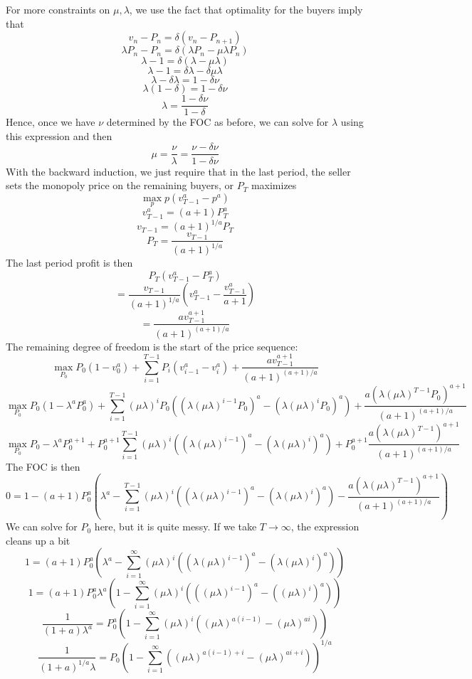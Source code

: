 \documentclass[10pt,letter]{article}
\begin{document}
For more constraints on $\mu, \lambda$, we use the fact that optimality for the buyers imply that
\[ v_{n} - P_n = \delta(v_{n} - P_{n+1}) \]
\[ \lambda P_n - P_n = \delta(\lambda P_{n} - \mu\lambda P_{n}) \]
\[ \lambda - 1 = \delta(\lambda  - \mu\lambda ) \]
\[ \lambda - 1 = \delta\lambda  - \delta \mu\lambda  \]
\[ \lambda - \delta\lambda =  1 - \delta \nu  \]
\[ \lambda (1 - \delta) =  1 - \delta \nu  \]
\[ \lambda  =  \frac{1 - \delta \nu}{1 - \delta}  \]
Hence, once we have $\nu$ determined by the FOC as before, we can solve for $\lambda$ using this expression and then
\[ \mu = \frac{\nu}{\lambda} = \frac{\nu - \delta\nu}{1 - \delta \nu}  \]
With the backward induction, we just require that in the last period, the seller sets the monopoly price on the remaining buyers, or $P_T$ maximizes
\[\max_p p (v_{T-1}^a - p^a)  \]
\[ v_{T-1}^a = (a + 1)P_T^a \]
\[ v_{T-1} = (a + 1)^{1/a}P_T \]
\[ P_T = \frac{v_{T-1}}{(a + 1)^{1/a}} \]
The last period profit is then
\[ P_T (v_{T-1}^a - P_T^a ) \]
\[ =\frac{v_{T-1}}{(a + 1)^{1/a}} (v_{T-1}^a - \frac{v_{T-1}^a}{a + 1} ) \]
\[ =\frac{a v_{T-1}^{a+1}}{(a + 1)^{(a + 1)/a}}  \]
The remaining degree of freedom is the start of the price sequence:
\[ \max_{P_0} P_0(1 - v_0^a )+\sum_{i=1}^{T-1}P_i(v_{i-1}^a - v_{i}^a) + \frac{a v_{T-1}^{a+1}}{(a + 1)^{(a + 1)/a}} \]
\[ \max_{P_0} P_0(1 - \lambda^a P_0^a )+\sum_{i=1}^{T-1}(\mu\lambda)^i P_0((\lambda (\mu\lambda)^{i-1} P_0)^a - (\lambda (\mu\lambda)^i P_0)^a) + \frac{a (\lambda (\mu\lambda)^{T-1} P_0)^{a+1}}{(a + 1)^{(a + 1)/a}} \]
\[ \max_{P_0} P_0 - \lambda^a P_0^{a+1}+P_0^{a + 1}\sum_{i=1}^{T-1}(\mu\lambda)^i ((\lambda (\mu\lambda)^{i-1} )^a - (\lambda (\mu\lambda)^i )^a) + P_0^{a + 1}\frac{a (\lambda (\mu\lambda)^{T-1} )^{a+1}}{(a + 1)^{(a + 1)/a}} \]
The FOC is then
\[ 0 = 1 - (a + 1)P_0^a \left( \lambda^a  - \sum_{i=1}^{T-1}(\mu\lambda)^i ((\lambda (\mu\lambda)^{i-1} )^a - (\lambda (\mu\lambda)^i )^a) - \frac{a (\lambda (\mu\lambda)^{T-1} )^{a+1}}{(a + 1)^{(a + 1)/a}} \right) \]
We can solve for $P_0$ here, but it is quite messy. If we take $T \to \infty$, the expression cleans up a bit
\[  1 = (a + 1)P_0^a \left( \lambda^a  - \sum_{i=1}^{\infty}(\mu\lambda)^i ((\lambda (\mu\lambda)^{i-1} )^a - (\lambda (\mu\lambda)^i )^a) \right) \]
\[  1 = (a + 1)P_0^a\lambda^a \left(  1 - \sum_{i=1}^{\infty}(\mu\lambda)^i (((\mu\lambda)^{i-1} )^a - ((\mu\lambda)^i )^a) \right) \]
\[  \frac{1}{(1 + a )\lambda^a} = P_0^a \left(  1 - \sum_{i=1}^{\infty}(\mu\lambda)^i ((\mu\lambda)^{a(i-1)}  - (\mu\lambda)^{ai} ) \right) \]
\[  \frac{1}{(1 + a )^{1/a}\lambda } = P_0 \left(  1 - \sum_{i=1}^{\infty} ((\mu\lambda)^{a(i-1) + i}  - (\mu\lambda)^{ai + i} ) \right)^{1/a} \]
\end{document}

